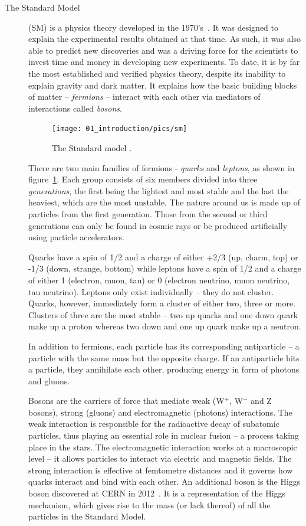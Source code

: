 \begin{description}
\item[The Standard Model]
(SM) is a physics theory developed in the 1970's~\cite{Novaes:1999yn}. It was designed to explain the experimental results obtained at that time. As such, it was also able to predict new discoveries and was a driving force for the scientists to invest time and money in developing new experiments. To date, it is by far the most established and verified physics theory, despite its inability to explain gravity and dark matter. It explains how the basic building blocks of matter -- \emph{fermions} -- interact with each other via mediators of interactions called \emph{bosons}.  
\begin{figure}[!t]
\centering
\texttt{[image: 01\_introduction/pics/sm]}
\caption{The Standard model \cite{Dominguez:2002395}.}
\label{fig:sm1}
\end{figure}
There are two main families of fermions - \emph{quarks} and \emph{leptons}, as shown in figure~\ref{fig:sm1}. Each group consists of six members divided into three \emph{generations}, the first being the lightest and most stable and the last the heaviest, which are the most unstable. The nature around us is made up of particles from the first generation. Those from the second or third generations can only be found in cosmic rays or be produced artificially using particle accelerators.

Quarks have a spin of 1/2 and a charge of either +2/3 (up, charm, top)  or -1/3  (down, strange, bottom) while leptons have a spin of 1/2  and a charge of either 1 (electron, muon, tau) or 0 (electron neutrino, muon neutrino, tau neutrino). Leptons only exist individually -- they do not cluster. Quarks, however, immediately form a cluster of either two, three or more. Clusters of three are the most stable -- two up quarks and one down quark make up a proton whereas two down and one up quark make up a neutron.

In addition to fermions, each particle has its corresponding antiparticle -- a particle with the same mass but the opposite charge. If an antiparticle hits a particle, they annihilate each other, producing energy in form of photons and gluons. 

Bosons are the carriers of force that mediate weak (W$^+$, W$^-$ and Z bosons), strong (gluons) and electromagnetic (photons) interactions. The weak interaction is responsible for the radioactive decay of subatomic particles, thus playing an essential role in nuclear fusion -- a process taking place in the stars. The electromagnetic interaction works at a macroscopic level -- it allows particles to interact via electric and magnetic fields. The strong interaction is effective at femtometre distances and it governs how quarks interact and bind with each other. An additional boson is the Higgs boson discovered at CERN in 2012~\cite{Rossi:2026222}. It is a representation of the Higgs mechanism, which gives rise to the mass (or lack thereof) of all the particles in the Standard Model.
\end{description}

